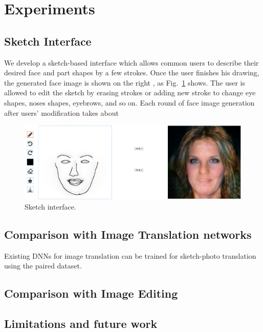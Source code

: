 \section{Experiments}
\label{sec:experiments}




\subsection{Sketch Interface}
We develop a sketch-based interface which allows common users to describe their desired face and part shapes by a few strokes. Once the user finishes his drawing, the generated face image is shown on the right , as Fig.~\ref{fig:interface} shows.
The user is allowed to edit the sketch by erasing strokes or adding new stroke to change eye shapes, noses shapes, eyebrows, and so on.
%
Each round of face image generation after users' modification takes about 
%




\begin{figure}
	\centering
	\includegraphics[width=\columnwidth]{figs/interface.png}
	\caption{Sketch interface. }
	\label{fig:interface}
\end{figure}
 



\subsection{Comparison with Image Translation networks}

Existing DNNs for image translation can be trained for sketch-photo translation using the paired dataset.

\subsection{Comparison with Image Editing}


\subsection{Limitations and future work}


